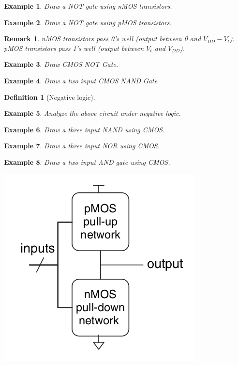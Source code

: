 \documentclass{article}
\newtheorem{example}{Example}
\newtheorem{remark}{Remark}
\newtheorem{definition}{Definition}
\begin{document}
\begin{example}
  Draw a NOT gate using nMOS transistors.
\end{example}
\vspace{10em}

\begin{example}
  Draw a NOT gate using pMOS transistors.
\end{example}
\vspace{10em}

\begin{remark}
  nMOS transistors pass 0's well (output between 0 and $V_{DD} - V_t$). pMOS
  transistors pass 1's well (output between $V_t$ and $V_{DD}$).
\end{remark}
\begin{example}
Draw CMOS NOT Gate.
\end{example}
\vspace{10em}

\begin{example}
Draw a two input CMOS NAND Gate
\end{example}
\vspace{10em}


\begin{definition}[Negative logic]
\end{definition}
\vspace{5em}

\begin{example}
  Analyze the above circuit under negative logic.
\end{example}
\vspace{10em}



\begin{example}
Draw a three input NAND using CMOS.
\end{example}
\vspace{10em}


\begin{example}
Draw a three input NOR using CMOS.
\end{example}
\vspace{10em}

\begin{example}
  Draw a two input AND gate using CMOS.
\end{example}
\vspace{10em}

\includegraphics[width=0.4\linewidth]{fig/fig1.34-inverting-logic-gate.png}
\end{document}
